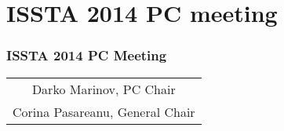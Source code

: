 \documentclass[17pt]{beamer}
\date{}
\begin{document}
\section{ISSTA 2014 PC meeting}

\frame
{
  \frametitle{ISSTA 2014 PC Meeting}

  \vfill
  \vfill

  \begin{center}
    \footnotesize 
    \begin{tabular}{c}
      Darko Marinov, PC Chair \\[0.25cm]
      Corina Pasareanu, General Chair \\[0.25cm]
    \end{tabular}
  \end{center}
}
\end{document}
